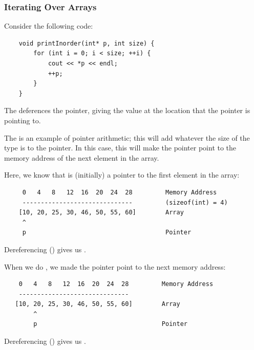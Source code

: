 \documentclass[letterpaper]{article}
\begin{document}
\subsubsection{Iterating Over Arrays}
Consider the following code: 
\begin{verbatim}
    void printInorder(int* p, int size) {
        for (int i = 0; i < size; ++i) {
            cout << *p << endl; 
            ++p; 
        }
    }
\end{verbatim}
The  deferences the pointer, giving the value at the location that the pointer is pointing to. 

\bigskip

The  is an example of pointer arithmetic; this will add whatever the size of the type is to the pointer. In this case, this will make the pointer point to the memory address of the next element in the array. 

\bigskip 

Here, we know that  is (initially) a pointer to the first element in the array: 
\begin{verbatim}
     0   4   8   12  16  20  24  28         Memory Address 
     ------------------------------         (sizeof(int) = 4)
    [10, 20, 25, 30, 46, 50, 55, 60]        Array 
     ^
     p                                      Pointer 
\end{verbatim}
Dereferencing  () gives us . 

\bigskip 

When we do , we made the pointer point to the next memory address: 
\begin{verbatim}
    0   4   8   12  16  20  24  28         Memory Address 
    ------------------------------
   [10, 20, 25, 30, 46, 50, 55, 60]        Array 
        ^
        p                                  Pointer 
\end{verbatim}
Dereferencing  () gives us . 
\end{document}
